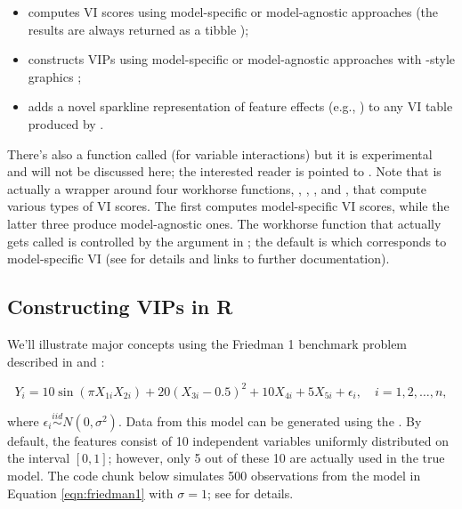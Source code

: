 \begin{itemize}

  \item {} computes VI scores using model-specific or model-agnostic approaches (the results are always returned as a tibble \citep{R-tibble});

  \item {} constructs VIPs using model-specific or model-agnostic approaches with -style graphics \citep{R-ggplot2};

  \item {} adds a novel sparkline representation of feature effects (e.g., ) to any VI table produced by .

\end{itemize}

There's also a function called  (for variable interactions)
but it is experimental and will not be discussed here; the interested
reader is pointed to \citet{greenwell-simple-2018}. Note that
 is actually a wrapper around four workhorse functions,
, , , and
, that compute various types of VI scores. The first
computes model-specific VI scores, while the latter three produce
model-agnostic ones. The workhorse function that actually gets called is
controlled by the  argument in ; the default is
 which corresponds to model-specific VI (see
 for details and links to further documentation).

\hypertarget{constructing-vips-in-r}{%
\subsection{Constructing VIPs in R}\label{constructing-vips-in-r}}

We'll illustrate major concepts using the Friedman 1 benchmark problem
described in \citet{multivariate-friedman-1991} and
\citet{bagging-breiman-1996}:

\begin{equation}
  Y_i = 10 \sin\left(\pi X_{1i} X_{2i}\right) + 20 \left(X_{3i} - 0.5\right) ^ 2 + 10 X_{4i} + 5 X_{5i} + \epsilon_i, \quad i = 1, 2, \dots, n,
\label{eqn:friedman1}
\end{equation}

where \(\epsilon_i \stackrel{iid}{\sim} N\left(0, \sigma^2\right)\).
Data from this model can be generated using the
. By default, the features consist of 10
independent variables uniformly distributed on the interval
\(\left[0,1\right]\); however, only 5 out of these 10 are actually used
in the true model. The code chunk below simulates 500 observations from
the model in Equation \eqref{eqn:friedman1} with \(\sigma = 1\); see
 for details.

